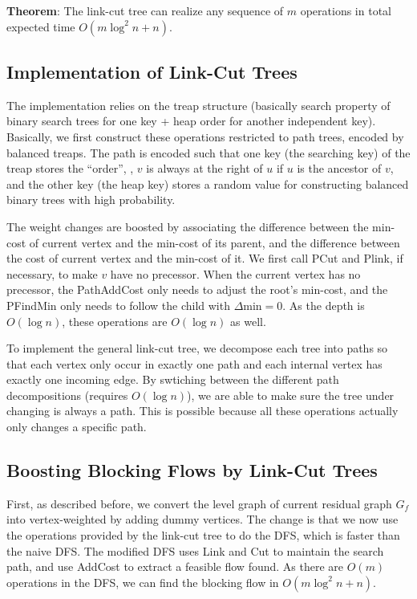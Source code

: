 \textbf{Theorem}: The link-cut tree can realize any sequence of $m$ operations in total expected time $O(m\log^2 n + n)$.

\subsection{Implementation of Link-Cut Trees}

The implementation relies on the treap structure (basically search property of binary search trees for one key + heap order for another independent key). Basically, we first construct these operations restricted to path trees, encoded by balanced treaps. The path is encoded such that one key (the searching key) of the treap stores the ``order'', \ie, $v$ is always at the right of $u$ if $u$ is the ancestor of $v$, and the other key (the heap key) stores a random value for constructing balanced binary trees with high probability.

The weight changes are boosted by associating the difference between the min-cost of current vertex and the min-cost of its parent, and the difference between the cost of current vertex and the min-cost of it. We first call PCut and Plink, if necessary, to make $v$ have no precessor. When the current vertex has no precessor, the PathAddCost only needs to adjust the root's min-cost, and the PFindMin only needs to follow the child with $\Delta \text{min}=0$. As the depth is $O(\log n)$, these operations are $O(\log n)$ as well.

To implement the general link-cut tree, we decompose each tree into paths so that each vertex only occur in exactly one path and each internal vertex has exactly one incoming edge. By swtiching between the different path decompositions (requires $O(\log n)$), we are able to make sure the tree under changing is always a path. This is possible because all these operations actually only changes a specific path.

\subsection{Boosting Blocking Flows by Link-Cut Trees}

First, as described before, we convert the level graph of current residual graph $G_f$ into vertex-weighted by adding dummy vertices. The change is that we now use the operations provided by the link-cut tree to do the DFS, which is faster than the naive DFS. The modified DFS uses Link and Cut to maintain the search path, and use AddCost to extract a feasible flow found. As there are $O(m)$ operations in the DFS, we can find the blocking flow in $O(m\log^2 n + n)$.